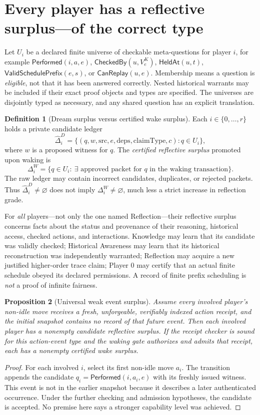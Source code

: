 \documentclass[11pt,letterpaper]{article}
\theoremstyle{definition}
\newtheorem{definition}{Definition}[section]
\theoremstyle{plain}
\newtheorem{proposition}[definition]{Proposition}
\theoremstyle{definition}
\newcommand{\s}{\mathsf}
\begin{document}
\section{Every player has a reflective surplus---of the correct type}\label{gl-first-W0-s5}
Let $U_i$ be a declared finite universe of checkable meta-questions for player $i$, for example \(\s{Performed}(i,a,e)\), \(\s{CheckedBy}(u,V^K_e)\), \(\s{HeldAt}(u,t)\), \(\s{ValidSchedulePrefix}(e,s)\), or \(\s{CanReplay}(u,e)\). Membership means a question is \emph{eligible}, not that it has been answered correctly. Nested historical warrants may be included if their exact proof objects and types are specified. The universes are disjointly typed as necessary, and any shared question has an explicit translation.

\begin{definition}[Dream surplus versus certified wake surplus]
Each $i\in\{0,\ldots,r\}$ holds a private candidate ledger
\[
 \widehat\Delta_i^D=\{(q,w,\mathrm{src},e,\mathrm{deps},\mathrm{claimType},c):
 q\in U_i\},
\]
where $w$ is a proposed witness for $q$. The \emph{certified reflective surplus} promoted upon waking is
\[
 \Delta_i^W=\big\{q\in U_i:\ \exists\text{ approved packet for }q
 \text{ in the waking transaction}\big\}.
\]
The raw ledger may contain incorrect candidates, duplicates, or rejected packets. Thus $\widehat\Delta_i^D\ne\varnothing$ does not imply $\Delta_i^W\ne\varnothing$, much less a strict increase in reflection grade.
\end{definition}

For \emph{all} players---not only the one named Reflection---their reflective surplus concerns facts about the status and provenance of their reasoning, historical access, checked actions, and interactions. Knowledge may learn that its candidate was validly checked; Historical Awareness may learn that its historical reconstruction was independently warranted; Reflection may acquire a new justified higher-order trace claim; Player 0 may certify that an actual finite schedule obeyed its declared permissions. A record of finite prefix scheduling is \emph{not} a proof of infinite fairness.

\begin{proposition}[Universal weak event surplus]
Assume every involved player's non-idle move receives a fresh, unforgeable, verifiably indexed action receipt, and the initial snapshot contains no record of that future event. Then each involved player has a nonempty candidate reflective surplus. If the receipt checker is sound for this action-event type and the waking gate authorizes and admits that receipt, each has a nonempty certified wake surplus.
\end{proposition}
\begin{proof}
For each involved $i$, select its first non-idle move $a_i$. The transition appends the candidate $q_i=\s{Performed}(i,a_i,e)$ with its freshly issued witness. This event is not in the earlier snapshot because it describes a later authenticated occurrence. Under the further checking and admission hypotheses, the candidate is accepted. No premise here says a stronger capability level was achieved.
\end{proof}
\end{document}
